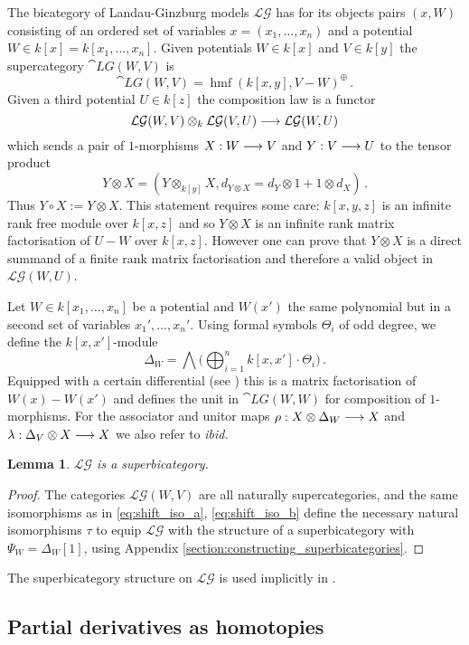 \documentclass[english,letter paper,12pt,leqno]{article}
\newtheorem{lemma}[theorem]{Lemma}
\theoremstyle{example}
\numberwithin{equation}{section}
\def\LG{\mathcal{LG}}
\DeclareMathOperator{\hmf}{hmf}
\begin{document}
The bicategory of Landau-Ginzburg models $\LG$ has for its objects pairs $(x,W)$ consisting of an ordered set of variables $x = (x_1,\ldots,x_n)$ and a potential $W \in k[x] = k[x_1,\ldots,x_n]$. Given potentials $W \in k[x]$ and $V \in k[y]$ the supercategory $\cat{LG}(W,V)$ is
\[
\cat{LG}(W,V) = \hmf(k[x,y], V - W)^{\oplus}\,.
\]
Given a third potential $U \in k[z]$ the composition law is a functor
\[
\LG(W,V) \otimes_k \LG(V, U) \lto \LG(W, U)
\]
which sends a pair of $1$-morphisms $X: W \longrightarrow V$ and $Y: V \longrightarrow U$ to the tensor product
\begin{equation}\label{eq:tensor_comp}
Y \otimes X = ( Y \otimes_{k[y]} X, d_{Y \otimes X} = d_Y \otimes 1 + 1 \otimes d_X )\,.
\end{equation}
Thus $Y \circ X := Y \otimes X$. This statement requires some care: $k[x,y,z]$ is an infinite rank free module over $k[x,z]$ and so $Y \otimes X$ is an infinite rank matrix factorisation of $U - W$ over $k[x,z]$. However one can prove that $Y \otimes X$ is a direct summand of a finite rank matrix factorisation \cite{dm1102.2957} and therefore a valid object in $\LG(W,U)$.

Let $W \in k[x_1,\ldots,x_n]$ be a potential and $W(x')$ the same polynomial but in a second set of variables $x_1',\ldots,x_n'$. Using formal symbols $\Theta_i$ of odd degree, we define the $k[x,x']$-module
\[
\Delta_W = \bigwedge \big( \bigoplus_{i=1}^n k[x,x'] \cdot \Theta_i \big)\,.
\]
Equipped with a certain differential (see \cite{lgdual}) this is a matrix factorisation of $W(x) - W(x')$ and defines the unit in $\cat{LG}(W,W)$ for composition of $1$-morphisms. For the associator and unitor maps $\rho: X \otimes \Delta_W \longrightarrow X$ and $\lambda: \Delta_V \otimes X \longrightarrow X$ we also refer to \emph{ibid.}

\begin{lemma} $\LG$ is a superbicategory.
\end{lemma}
\begin{proof}
The categories $\LG(W,V)$ are all naturally supercategories, and the same isomorphisms as in \eqref{eq:shift_iso_a}, \eqref{eq:shift_iso_b} define the necessary natural isomorphisms $\tau$ to equip $\LG$ with the structure of a superbicategory with $\Psi_W = \Delta_W[1]$, using Appendix \ref{section:constructing_superbicategories}.
\end{proof}

The superbicategory structure on $\LG$ is used implicitly in \cite[Section 7]{lgdual}.

\subsection{Partial derivatives as homotopies}\label{section:partial}
\end{document}
